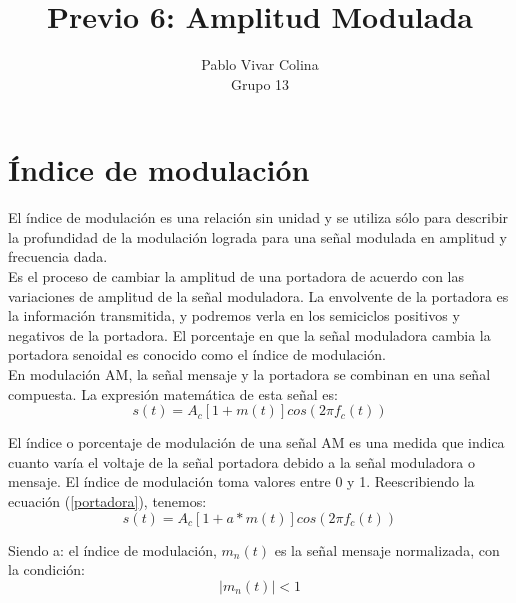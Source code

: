 \documentclass{article}
\title{Previo 6: Amplitud Modulada}
\author{Pablo Vivar Colina\\
Grupo 13
}
\begin{document}
\maketitle

\section{Índice de modulación}

El índice de modulación es una relación sin unidad y se utiliza sólo para describir la profundidad de la modulación lograda para una señal modulada en amplitud y frecuencia dada.\citep{IndiceModulacion}\\

Es el proceso de cambiar la amplitud de una portadora de acuerdo con las variaciones de amplitud de la señal moduladora. La envolvente de la portadora es la información transmitida, y podremos verla en los semiciclos positivos y negativos de la portadora. El porcentaje en que la señal moduladora cambia la portadora senoidal es conocido como el
índice de modulación.\citep{IndiceModulacion}\\

En modulación AM, la señal mensaje y la portadora se combinan en una señal compuesta. La expresión matemática de esta señal es:\citep{IndiceModulacion}\\

\begin{equation}
    s(t)=A_c[1+m(t)]cos(2 \pi f_c(t))
    \label{portadora}
\end{equation}

El índice o porcentaje de modulación de una señal AM es una medida que indica cuanto varía el voltaje de la señal portadora debido a la señal moduladora o mensaje. El índice de modulación toma valores entre 0 y 1. Reescribiendo la ecuación (\ref{portadora}), tenemos:\citep{IndiceModulacion}\\


    \begin{equation}
    s(t)=A_c[1+a*m(t)]cos(2 \pi f_c(t))
    \label{portadoraPorA}
\end{equation}

Siendo a: el índice de modulación, $m_n(t)$ es la señal mensaje normalizada, con la condición:\citep{IndiceModulacion}\\

\begin{equation}
    |m_n(t)|<1
\end{equation}
\end{document}
